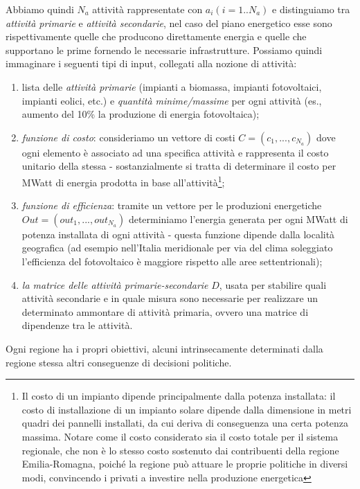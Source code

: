 \documentclass[12pt,a4paper,openright,twoside]{report}
\begin{document}
Abbiamo quindi $N_a$ attività rappresentate con $a_i (i=1..N_a)$ e distinguiamo tra \emph{attività primarie} e \emph{attività secondarie}, nel caso del piano energetico esse sono rispettivamente quelle che producono direttamente energia e quelle che supportano le prime fornendo le necessarie infrastrutture. Possiamo quindi immaginare i seguenti tipi di input, collegati alla nozione di attività:
\begin{enumerate}
\item lista delle \emph{attività primarie} (impianti a biomassa, impianti fotovoltaici, impianti eolici, etc.) e \emph{quantità minime/massime} per ogni attività (es., aumento del 10\% la produzione di energia fotovoltaica);
\item \emph{funzione di costo}: consideriamo un vettore di costi $C=(c_1,...,c_{N_a})$ dove ogni elemento è associato ad una specifica attività e rappresenta il costo unitario della stessa - sostanzialmente si tratta di determinare il costo per MWatt di energia prodotta in base all'attività\footnote{Il costo di un impianto dipende principalmente dalla potenza installata: il costo di installazione di un impianto solare dipende dalla dimensione in metri quadri dei pannelli installati, da cui deriva di conseguenza una certa potenza massima. Notare come il costo considerato sia il costo totale per il sistema regionale, che non è lo stesso costo sostenuto dai contribuenti della regione Emilia-Romagna, poiché la regione può attuare le proprie politiche in diversi modi, convincendo i privati a investire nella produzione energetica};
\item \emph{funzione di efficienza}: tramite un vettore per le produzioni energetiche $Out=(out_1,...,out_{N_a})$ determiniamo l'energia generata per ogni MWatt di potenza installata di ogni attività - questa funzione dipende dalla località geografica (ad esempio nell'Italia meridionale per via del clima soleggiato l'efficienza del fotovoltaico è maggiore rispetto alle aree settentrionali); 
\item \emph{la matrice delle attività primarie-secondarie} $D$, usata per stabilire quali attività secondarie e in quale misura sono necessarie per realizzare un determinato ammontare di attività primaria, ovvero una matrice di dipendenze tra le attività. 
\end{enumerate}
Ogni regione ha i propri obiettivi, alcuni intrinsecamente determinati dalla regione stessa altri conseguenze di decisioni politiche.
\end{document}
